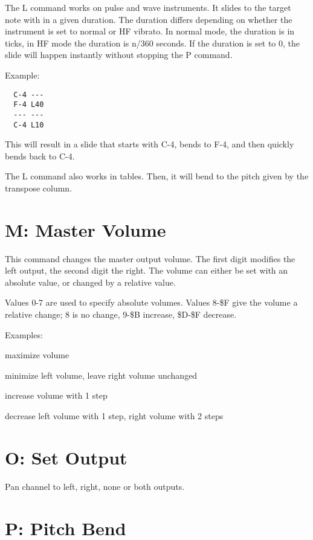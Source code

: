 The L command works on pulse and wave instruments. It slides to the target note with in a given duration. The duration differs depending on whether the instrument is set to normal or HF vibrato. In normal mode, the duration is in ticks, in HF mode the duration is n/360 seconds. If the duration is set to 0, the slide will happen instantly without stopping the P command.

Example:

\begin{verbatim}
  C-4 ---
  F-4 L40
  --- ---
  C-4 L10
\end{verbatim}

This will result in a slide that starts with C-4, bends to F-4, and then quickly bends back to C-4.

The L command also works in tables. Then, it will bend to the pitch given by the transpose column.

\section{M: Master Volume}

This command changes the master output volume. The first digit modifies the left output, the second digit the right. The volume can either be set with an absolute value, or changed by a relative value.

Values 0-7 are used to specify absolute volumes. Values 8-\$F give the volume a relative change; 8 is no change, 9-\$B increase, \$D-\$F decrease.

\begin{description}
\item Examples:
\item[M77] maximize volume
\item[M08] minimize left volume, leave right volume unchanged
\item[M99] increase volume with 1 step
\item[MFE] decrease left volume with 1 step, right volume with 2 steps
\end{description}

\section{O: Set Output}

Pan channel to left, right, none or both outputs.

\section{P: Pitch Bend}

